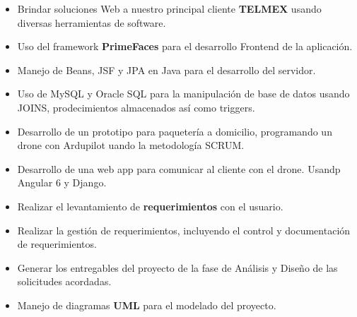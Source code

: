 \documentclass[letterpaper]{twentysecondcv} %
\begin{document}


\begin{itemize}
	\item Brindar soluciones Web a nuestro principal cliente \textbf{TELMEX} usando diversas herramientas de software.
	\item Uso del framework \textbf{PrimeFaces} para el desarrollo Frontend de la aplicación.
	\item Manejo de Beans, JSF y JPA en Java para el desarrollo del servidor.
	\item Uso de MySQL y Oracle SQL para la manipulación de base de datos usando JOINS, prodecimientos almacenados así como triggers.
\end{itemize}

\divider

\begin{itemize}
	\item Desarrollo de un prototipo para paquetería a domicilio, programando un drone con Ardupilot uando la metodología SCRUM.
	\item Desarrollo de una web app para comunicar al cliente con el drone. Usandp Angular 6 y Django.
\end{itemize}


\newpage %

\makeprofileSecond %

\begin{itemize}
	\item Realizar el levantamiento de \textbf{requerimientos} con el usuario.
	\item Realizar la gestión de requerimientos, incluyendo el control y documentación de requerimientos.
	\item Generar los entregables del proyecto de la fase de Análisis y Diseño de las solicitudes acordadas.
	\item Manejo de diagramas \textbf{UML} para el modelado del proyecto.
\end{itemize}
\end{document}
